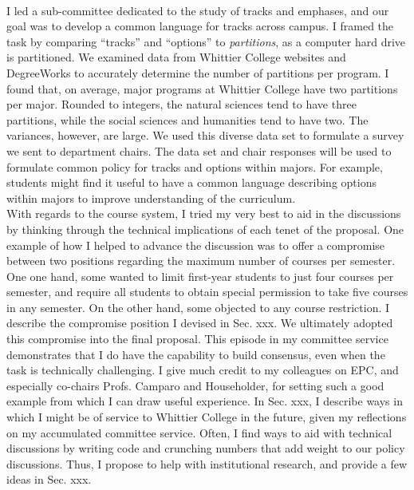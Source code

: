 \documentclass[../../main.tex]{subfiles}
\begin{document}
\\
\vspace{0.25cm}
I led a sub-committee dedicated to the study of tracks and emphases, and our goal was to develop a common language for tracks across campus.  I framed the task by comparing ``tracks'' and ``options'' to \textit{partitions}, as a computer hard drive is partitioned.  We examined data from Whittier College websites and DegreeWorks to accurately determine the number of partitions per program.  I found that, on average, major programs at Whittier College have two partitions per major. Rounded to integers, the natural sciences tend to have three partitions, while the social sciences and humanities tend to have two.  The variances, however, are large.  We used this diverse data set to formulate a survey we sent to department chairs.  The data set and chair responses will be used to formulate common policy for tracks and options within majors.  For example, students might find it useful to have a common language describing options within majors to improve understanding of the curriculum.
\\
\vspace{0.25cm}
With regards to the course system, I tried my very best to aid in the discussions by thinking through the technical implications of each tenet of the proposal.  One example of how I helped to advance the discussion was to offer a compromise between two positions regarding the maximum number of courses per semester.  One one hand, some wanted to limit first-year students to just four courses per semester, and require all students to obtain special permission to take five courses in any semester.  On the other hand, some objected to any course restriction.  I describe the compromise position I devised in Sec. xxx.  We ultimately adopted this compromise into the final proposal.  This episode in my committee service demonstrates that I do have the capability to build consensus, even when the task is technically challenging.  I give much credit to my colleagues on EPC, and especially co-chairs Profs. Camparo and Householder, for setting such a good example from which I can draw useful experience.  In Sec. xxx, I describe ways in which I might be of service to Whittier College in the future, given my reflections on my accumulated committee service.  Often, I find ways to aid with technical discussions by writing code and crunching numbers that add weight to our policy discussions.  Thus, I propose to help with institutional research, and provide a few ideas in Sec. xxx.
\\
\end{document}
